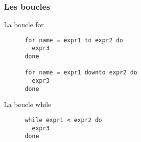 \begin{frame}[fragile]
    \frametitle{Les boucles}
    \begin{block}{La boucle for}
	\begin{lstlisting}
	  for name = expr1 to expr2 do
	    expr3
	  done

	  for name = expr1 downto expr2 do
	    expr3
	  done
	\end{lstlisting}
      \end{block}
	\begin{block}{La boucle while}
	\begin{lstlisting}
	  while expr1 < expr2 do
	    expr3
	  done
      \end{lstlisting}
  \end{block}
\end{frame}
